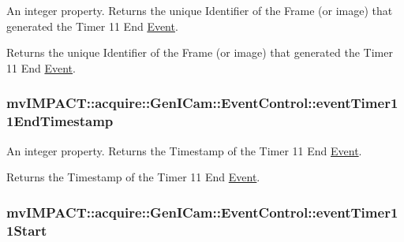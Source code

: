 An integer property. Returns the unique Identifier of the Frame (or image) that generated the Timer 11 End \hyperlink{classmv_i_m_p_a_c_t_1_1acquire_1_1_event}{Event}. 

Returns the unique Identifier of the Frame (or image) that generated the Timer 11 End \hyperlink{classmv_i_m_p_a_c_t_1_1acquire_1_1_event}{Event}. \hypertarget{classmv_i_m_p_a_c_t_1_1acquire_1_1_gen_i_cam_1_1_event_control_adc13de766f617c535298458fb07ada82}{
\subsubsection[{event\+Timer11\+End\+Timestamp}]{ mv\+I\+M\+P\+A\+C\+T\+::acquire\+::\+Gen\+I\+Cam\+::\+Event\+Control\+::event\+Timer11\+End\+Timestamp}}\label{classmv_i_m_p_a_c_t_1_1acquire_1_1_gen_i_cam_1_1_event_control_adc13de766f617c535298458fb07ada82}


An integer property. Returns the Timestamp of the Timer 11 End \hyperlink{classmv_i_m_p_a_c_t_1_1acquire_1_1_event}{Event}. 

Returns the Timestamp of the Timer 11 End \hyperlink{classmv_i_m_p_a_c_t_1_1acquire_1_1_event}{Event}. \hypertarget{classmv_i_m_p_a_c_t_1_1acquire_1_1_gen_i_cam_1_1_event_control_ad35735dc5c59c0372babf99b28ce3033}{
\subsubsection[{event\+Timer11\+Start}]{ mv\+I\+M\+P\+A\+C\+T\+::acquire\+::\+Gen\+I\+Cam\+::\+Event\+Control\+::event\+Timer11\+Start}}\label{classmv_i_m_p_a_c_t_1_1acquire_1_1_gen_i_cam_1_1_event_control_ad35735dc5c59c0372babf99b28ce3033}


